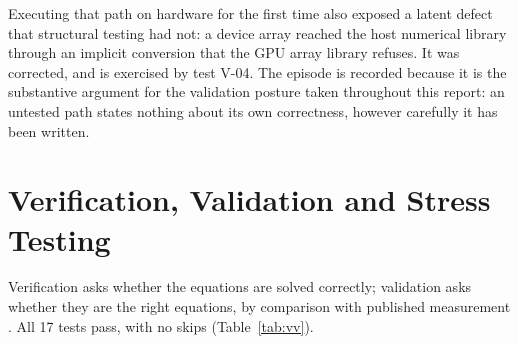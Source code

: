 \documentclass[11pt]{article}
\begin{document}
Executing that path on hardware for the first time also exposed a latent defect
that structural testing had not: a device array reached the host numerical
library through an implicit conversion that the GPU array library refuses. It
was corrected, and is exercised by test V-04. The episode is recorded because it
is the substantive argument for the validation posture taken throughout this
report: an untested path states nothing about its own correctness, however
carefully it has been written.

\section{Verification, Validation and Stress Testing}
Verification asks whether the equations are solved correctly; validation asks
whether they are the right equations, by comparison with published measurement
\cite{oberkampf2010}. All 17 tests pass, with no skips (Table~\ref{tab:vv}).
\end{document}
